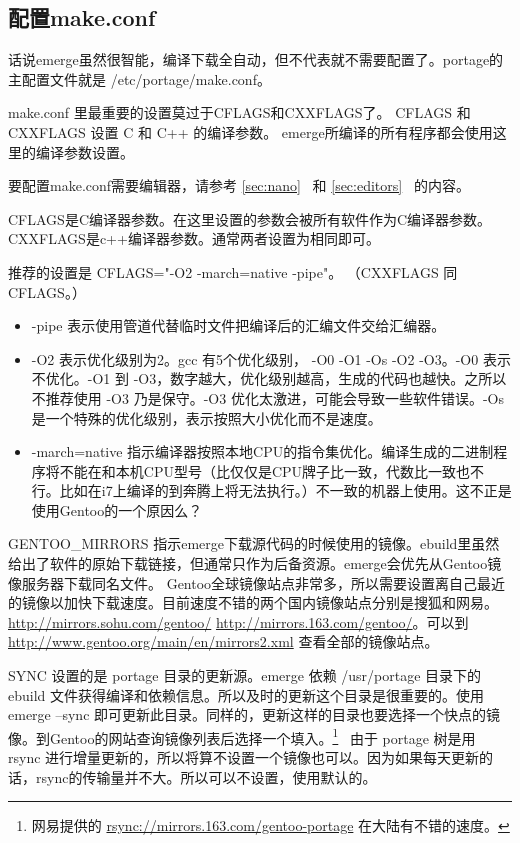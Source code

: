 \documentclass[amstex,twoside]{ctexbook}
\newcommand{\secref}[1]{ { \it节\ref{#1}~\nameref{#1}} }
\begin{document}
\subsection{配置make.conf}

话说emerge虽然很智能，编译下载全自动，但不代表就不需要配置了。portage的主配置文件就是 /etc/portage/make.conf。

make.conf 里最重要的设置莫过于CFLAGS和CXXFLAGS了。 
CFLAGS 和 CXXFLAGS 设置 C 和 C++ 的编译参数。
emerge所编译的所有程序都会使用这里的编译参数设置。

要配置make.conf需要编辑器，请参考\secref{sec:nano}和\secref{sec:editors}
的内容。

CFLAGS是C编译器参数。在这里设置的参数会被所有软件作为C编译器参数。CXXFLAGS是c++编译器参数。通常两者设置为相同即可。

推荐的设置是 CFLAGS="-O2 -march=native -pipe"。
（CXXFLAGS 同 CFLAGS。）

\begin{itemize}
\item -pipe 表示使用管道代替临时文件把编译后的汇编文件交给汇编器。
\item -O2 表示优化级别为2。gcc 有5个优化级别， -O0 -O1 -Os -O2 -O3。-O0 表示不优化。-O1 到 -O3，数字越大，优化级别越高，生成的代码也越快。之所以不推荐使用 -O3 乃是保守。-O3 优化太激进，可能会导致一些软件错误。-Os是一个特殊的优化级别，表示按照大小优化而不是速度。
\item -march=native 指示编译器按照本地CPU的指令集优化。编译生成的二进制程序将不能在和本机CPU型号（比仅仅是CPU牌子比一致，代数比一致也不行。比如在i7上编译的到奔腾上将无法执行。）不一致的机器上使用。这不正是使用Gentoo的一个原因么？
\end{itemize}


GENTOO\_MIRRORS 指示emerge下载源代码的时候使用的镜像。ebuild里虽然给出了软件的原始下载链接，但通常只作为后备资源。emerge会优先从Gentoo镜像服务器下载同名文件。
Gentoo全球镜像站点非常多，所以需要设置离自己最近的镜像以加快下载速度。目前速度不错的两个国内镜像站点分别是搜狐和网易。\url{http://mirrors.sohu.com/gentoo/} \url{http://mirrors.163.com/gentoo/}。可以到 \url{http://www.gentoo.org/main/en/mirrors2.xml} 查看全部的镜像站点。

SYNC %
设置的是 portage 目录的更新源。emerge 依赖 /usr/portage 目录下的 ebuild 文件获得编译和依赖信息。所以及时的更新这个目录是很重要的。使用 emerge --sync 
即可更新此目录。同样的，更新这样的目录也要选择一个快点的镜像。到Gentoo的网站查询镜像列表后选择一个填入。\footnote{网易提供的 \url{rsync://mirrors.163.com/gentoo-portage} 在大陆有不错的速度。}~ 由于 portage 树是用 rsync 进行增量更新的，所以将算不设置一个镜像也可以。因为如果每天更新的话，rsync的传输量并不大。所以可以不设置，使用默认的。
\end{document}
